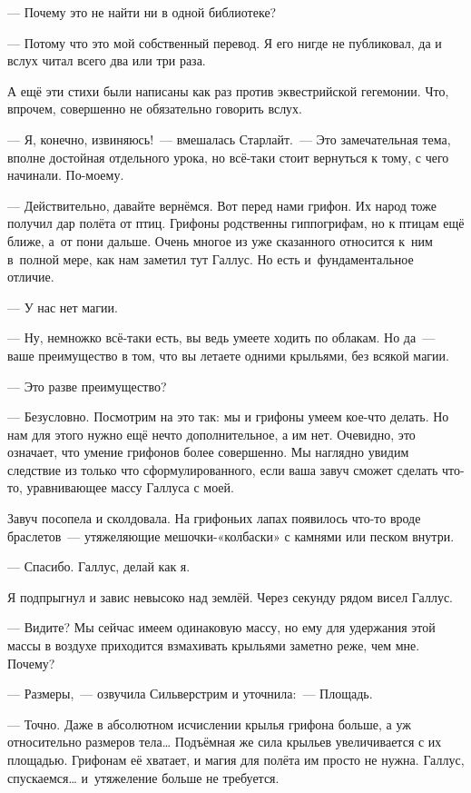\documentclass[fontsize=11pt,a5paper,titlepage=firstcover]{scrbook}
\begin{document}
--- Почему это не найти ни в одной библиотеке?

--- Потому что это мой собственный перевод. Я его нигде не публиковал, да и вслух читал всего два или три раза.

А ещё эти стихи были написаны как раз против эквестрийской гегемонии. Что, впрочем, совершенно не обязательно говорить вслух.

--- Я, конечно, извиняюсь!~--- вмешалась Старлайт.~--- Это замечательная тема, вполне достойная отдельного урока, но всё-таки стоит вернуться к тому, с чего начинали. По-моему.

--- Действительно, давайте вернёмся. Вот перед нами грифон. Их народ тоже получил дар полёта от птиц. Грифоны родственны гиппогрифам, но к птицам ещё ближе, а~от пони дальше. Очень многое из уже сказанного относится к~ним в~полной мере, как нам заметил тут Галлус. Но есть и~фундаментальное отличие.

--- У нас нет магии.

--- Ну, немножко всё-таки есть, вы ведь умеете ходить по облакам. Но да~--- ваше преимущество в том, что вы летаете одними крыльями, без всякой магии.

--- Это разве преимущество?

--- Безусловно. Посмотрим на это так: мы и грифоны умеем кое-что делать. Но нам для этого нужно ещё нечто дополнительное, а им нет. Очевидно, это означает, что умение грифонов более совершенно. Мы наглядно увидим следствие из только что сформулированного, если ваша завуч сможет сделать что-то, уравнивающее массу Галлуса с моей.

Завуч посопела и сколдовала. На грифоньих лапах появилось что-то вроде браслетов~--- утяжеляющие мешочки-«колбаски» с камнями или песком внутри.

--- Спасибо. Галлус, делай как я.

Я подпрыгнул и завис невысоко над землёй. Через секунду рядом висел Галлус.

--- Видите? Мы сейчас имеем одинаковую массу, но ему для удержания этой массы в воздухе приходится взмахивать крыльями заметно реже, чем мне. Почему?

--- Размеры,~--- озвучила Сильверстрим и уточнила:~--- Площадь.

--- Точно. Даже в абсолютном исчислении крылья грифона больше, а уж относительно размеров тела{\ldots} Подъёмная же сила крыльев увеличивается с их площадью. Грифонам её хватает, и магия для полёта им просто не нужна. Галлус, спускаемся{\ldots} и~утяжеление больше не требуется.
\end{document}

